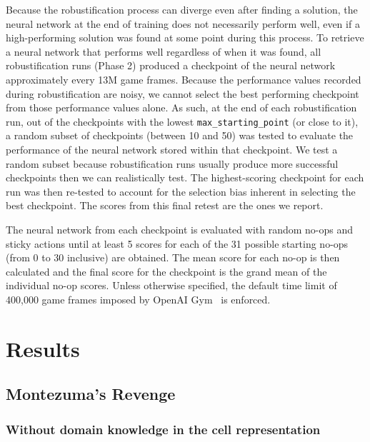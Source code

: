 \documentclass{article}
\begin{document}
Because the robustification process can diverge even after finding a solution, the neural network at the end of training does not necessarily perform well, even if a high-performing solution was found at some point during this process. To retrieve a neural network that performs well regardless of when it was found, all robustification runs (Phase 2) produced a checkpoint of the neural network approximately every 13M game frames. Because the performance values recorded during robustification are noisy, we cannot select the best performing checkpoint from those performance values alone. As such, at the end of each robustification run, out of the checkpoints with the lowest \texttt{max\_starting\_point} (or close to it), a random subset of checkpoints (between 10 and 50) was tested to evaluate the performance of the neural network stored within that checkpoint. We test a random subset because robustification runs usually produce more successful checkpoints then we can realistically test. The highest-scoring checkpoint for each run was then re-tested to account for the selection bias inherent in selecting the best checkpoint. The scores from this final retest are the ones we report.

The neural network from each checkpoint is evaluated with random no-ops and sticky actions until at least 5 scores for each of the 31 possible starting no-ops (from 0 to 30 inclusive) are obtained. The mean score for each no-op is then calculated and the final score for the checkpoint is the grand mean of the individual no-op scores. Unless otherwise specified, the default time limit of 400,000 game frames imposed by OpenAI Gym~\cite{brockman} is enforced.

\section{Results}
\label{sec:results}

\subsection{Montezuma's Revenge}
\label{sec:mr_no_domain_knowledge}
\subsubsection{Without domain knowledge in the cell representation}

\FloatBarrier
\end{document}
